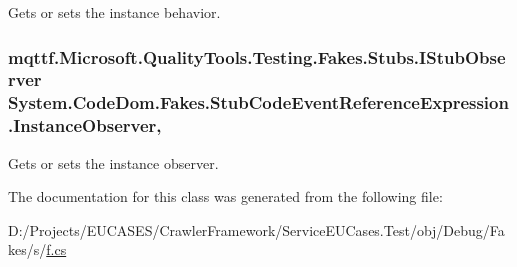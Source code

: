 Gets or sets the instance behavior.

\hypertarget{class_system_1_1_code_dom_1_1_fakes_1_1_stub_code_event_reference_expression_a0af41a74414045cb374dd54e739e584f}{
\subsubsection[{Instance\-Observer}]{\setlength{\rightskip}{0pt plus 5cm}mqttf.\-Microsoft.\-Quality\-Tools.\-Testing.\-Fakes.\-Stubs.\-I\-Stub\-Observer System.\-Code\-Dom.\-Fakes.\-Stub\-Code\-Event\-Reference\-Expression.\-Instance\-Observer\hspace{0.3cm}{\ttfamily [get]}, {\ttfamily [set]}}}\label{class_system_1_1_code_dom_1_1_fakes_1_1_stub_code_event_reference_expression_a0af41a74414045cb374dd54e739e584f}


Gets or sets the instance observer.



The documentation for this class was generated from the following file\-:\begin{DoxyCompactItemize}
\item 
D\-:/\-Projects/\-E\-U\-C\-A\-S\-E\-S/\-Crawler\-Framework/\-Service\-E\-U\-Cases.\-Test/obj/\-Debug/\-Fakes/s/\hyperlink{s_2f_8cs}{f.\-cs}\end{DoxyCompactItemize}
